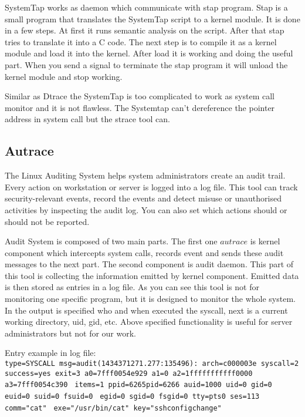 SystemTap works as daemon which communicate with stap program.
Stap is a small program that translates the SystemTap script to a kernel module.
It is done in a few steps.
At first it runs semantic analysis on the script.
After that stap tries to translate it into a C code.
The next step is to compile it as a kernel module and load it into the kernel.
After load it is working and doing the useful part.
When you send a signal to terminate the stap program it will unload the kernel module and stop working.

Similar as Dtrace the SystemTap is too complicated to work as system call monitor and it is not flawless.
The Systemtap can't dereference the pointer address in system call but the strace tool can.


\subsection{Autrace}
The Linux Auditing System helps system administrators create an audit trail.
Every action on workstation or server is logged into a log file.
This tool can track security-relevant events, record the events and detect misuse or unauthorised activities by inspecting the audit log.
You can also set which actions should or should not be reported.

Audit System is composed of two main parts.
The first one \(autrace\) is kernel component which intercepts system calls, records event and sends these audit messages to the next part.
The second component is audit daemon.
This part of this tool is collecting the information emitted by kernel component.
Emitted data is then stored as entries in a log file.
As you can see this tool is not for monitoring one specific program, but it is designed to monitor the whole system.
In the output is specified who and when executed the syscall, next is a current working directory, uid, gid, etc.
Above specified functionality is useful for server administrators but not for our work.

\pagebreak
Entry example in log file:\\
\noindent
\texttt{type=SYSCALL msg=audit(1434371271.277:135496): arch=c000003e syscall=2}\linebreak
\texttt{success=yes exit=3 a0=7fff0054e929 a1=0 a2=1fffffffffff0000 a3=7fff0054c390 }\linebreak
\texttt{items=1 ppid=6265pid=6266 auid=1000 uid=0 gid=0 euid=0 suid=0 fsuid=0 }\linebreak
\texttt{egid=0 sgid=0 fsgid=0 tty=pts0 ses=113 comm="cat" }\linebreak
\texttt{exe="/usr/bin/cat" key="sshconfigchange"}


